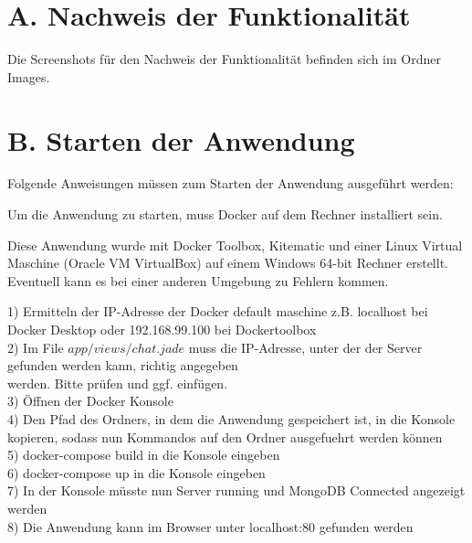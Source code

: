 
\addchap{\langanhang}


\section*{A. Nachweis der Funktionalität}\label{sec:NachweisFunktionalitaet}
Die Screenshots für den Nachweis der Funktionalität befinden sich im Ordner Images.
\pagebreak

\section*{B. Starten der Anwendung}\label{sec:Starten}

Folgende Anweisungen müssen zum Starten der Anwendung ausgeführt werden:

Um die Anwendung zu starten, muss Docker auf dem Rechner installiert sein.

Diese Anwendung wurde mit Docker Toolbox, Kitematic und einer Linux Virtual Maschine 
(Oracle VM VirtualBox) auf einem Windows 64-bit Rechner erstellt. Eventuell kann es bei einer anderen Umgebung zu Fehlern kommen.

1)	Ermitteln der IP-Adresse der Docker default maschine 
	z.B. localhost bei Docker Desktop oder 192.168.99.100 bei Dockertoolbox\\
2)	Im File $app/views/chat.jade$ muss die IP-Adresse, unter der der Server gefunden werden kann, richtig angegeben\\
	werden. Bitte prüfen und ggf. einfügen.\\
3)	Öffnen der Docker Konsole\\
4)	Den Pfad des Ordners, in dem die Anwendung gespeichert ist,  in die Konsole kopieren, sodass nun Kommandos auf den Ordner ausgefuehrt werden können\\
5)	docker-compose build in die Konsole eingeben\\
6)	docker-compose up in die Konsole eingeben\\
7)	In der Konsole müsste nun Server running und MongoDB Connected angezeigt werden\\
8)	Die Anwendung kann im Browser unter localhost:80 gefunden werden\\

 